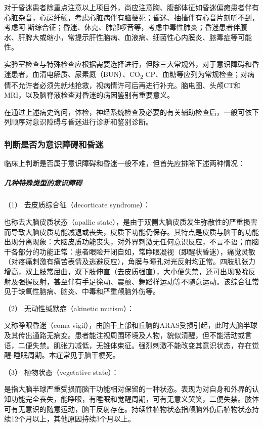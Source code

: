 对于昏迷患者除重点注意以上项目外，尚应注意胸、腹部体征如昏迷偏瘫患者伴有心脏杂音，心房纤颤，考虑心脏病伴有脑梗死；昏迷、抽搐伴有心音片刻听不到，考虑阿-斯综合征；昏迷、休克、肺部啰音等，考虑中毒性肺炎；昏迷患者伴腹水、肝脾大或缩小，常提示肝性脑病、血液病、细菌性心内膜炎、脓毒症等可能性。

实验室检查与特殊检查应根据需要选择进行，但除三大常规外，对于意识障碍和昏迷患者，血清电解质、尿素氮（BUN）、CO\textsubscript{2}
CP、血糖等应列为常规检查；对病情不允许者必须先就地抢救，视病情许可后再进行补充。脑电图、头颅CT和MRI，以及脑脊液检查对昏迷的病因鉴别有重要意义。

在通过上述病史询问，体检，神经系统检查及必要的有关辅助检查后，一般可依下列顺序对意识障碍与昏迷进行诊断和鉴别诊断。

\subsubsection{判断是否为意识障碍和昏迷}

临床上判断是否属于意识障碍和昏迷一般不难，但首先应排除下述两种情况：

\subparagraph{几种特殊类型的意识障碍}

\hypertarget{text00010.htmlux5cux23CHP1-2-2-2-1-1}{}
（1） 去皮质综合征（decorticate syndrome）：

也称去大脑皮质状态（apallic
state），是由于双侧大脑皮质发生弥散性的严重损害而导致大脑皮质功能减退或丧失，皮质下功能仍保存。其特点是皮质与脑干的功能出现分离现象：大脑皮质功能丧失，对外界刺激无任何意识反应，不言不语；而脑干各部分的功能正常：患者眼睑开闭自如，常睁眼凝视（即醒状昏迷），痛觉灵敏（对疼痛刺激有痛苦表情及逃避反应），角膜与瞳孔对光反射均正常。四肢肌张力增高，双上肢常屈曲，双下肢伸直（去皮质强直），大小便失禁，还可出现吸吮反射及强握反射，甚至伴有手足徐动、震颤、舞蹈样运动等不随意运动。该综合征常见于缺氧性脑病、脑炎、中毒和严重颅脑外伤等。

\hypertarget{text00010.htmlux5cux23CHP1-2-2-2-1-2}{}
（2） 无动性缄默症（akinetic mutism）：

又称睁眼昏迷（coma
vigil），由脑干上部和丘脑的ARAS受损引起，此时大脑半球及其传出通路无病变。患者能注视周围环境及人物，貌似清醒，但不能活动或言语，二便失禁。肌张力减低，无锥体束征。强烈刺激不能改变其意识状态，存在觉醒-睡眠周期。本症常见于脑干梗死。

\hypertarget{text00010.htmlux5cux23CHP1-2-2-2-1-3}{}
（3） 植物状态（vegetative state）：

是指大脑半球严重受损而脑干功能相对保留的一种状态。表现为对自身和外界的认知功能完全丧失，能睁眼，有睡眠和觉醒周期，可有无意义哭笑，二便失禁。肢体可有无意识的随意运动，脑干反射存在。持续性植物状态指颅脑外伤后植物状态持续12个月以上，其他原因持续3个月以上。

